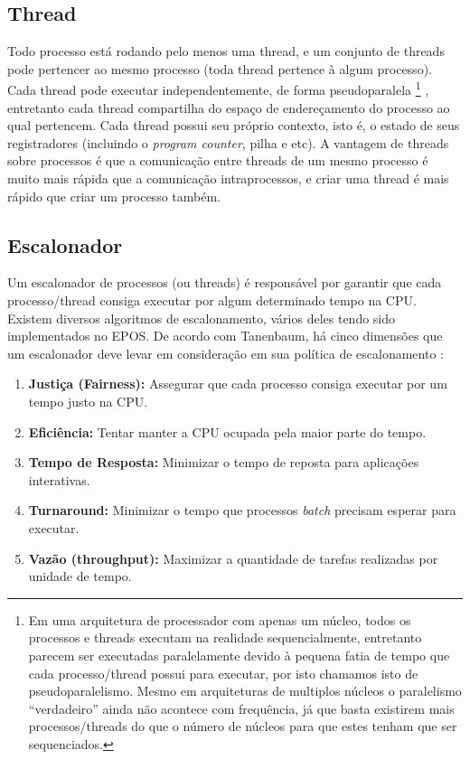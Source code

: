 \subsection{Thread}
Todo processo está rodando pelo menos uma thread, e um conjunto de threads pode pertencer ao mesmo processo (toda thread pertence à algum processo). Cada thread pode executar independentemente, de forma pseudoparalela
\footnote{Em uma arquitetura de processador com apenas um núcleo, todos os processos e threads executam na realidade sequencialmente, entretanto parecem ser executadas paralelamente devido à pequena fatia de tempo que cada processo/thread possui para executar, por isto chamamos isto de pseudoparalelismo. Mesmo em arquiteturas de multiplos núcleos o paralelismo ``verdadeiro'' ainda não acontece com frequência, já que basta existirem mais processos/threads do que o número de núcleos para que estes tenham que ser sequenciados.}
, entretanto cada thread compartilha do espaço de endereçamento do processo ao qual pertencem. Cada thread possui seu próprio contexto, isto é, o estado de seus registradores (incluindo o \emph{program counter}, pilha e etc).
A vantagem de threads sobre processos é que a comunicação entre threads de um mesmo processo é muito mais rápida que a comunicação intraprocessos, e criar uma thread é mais rápido que criar um processo também.

\subsection{Escalonador}
\label{escalonador}

Um escalonador de processos (ou threads) é responsável por garantir que cada processo/thread consiga executar por algum determinado tempo na CPU. Existem diversos algoritmos de escalonamento, vários deles tendo sido implementados no EPOS. De acordo com Tanenbaum, há cinco dimensões que um escalonador deve levar em consideração em sua política de escalonamento \cite{tanenbaum}:

\begin{enumerate}
\item \textbf{Justiça (Fairness):} Assegurar que cada processo consiga executar por um tempo justo na CPU.
\item \textbf{Eficiência:} Tentar manter a CPU ocupada pela maior parte do tempo.
\item \textbf{Tempo de Resposta:} Minimizar o tempo de reposta para aplicações interativas.
\item \textbf{Turnaround:} Minimizar o tempo que processos \emph{batch} precisam esperar para executar.
\item \textbf{Vazão (throughput):} Maximizar a quantidade de tarefas realizadas por unidade de tempo.
\end{enumerate}

